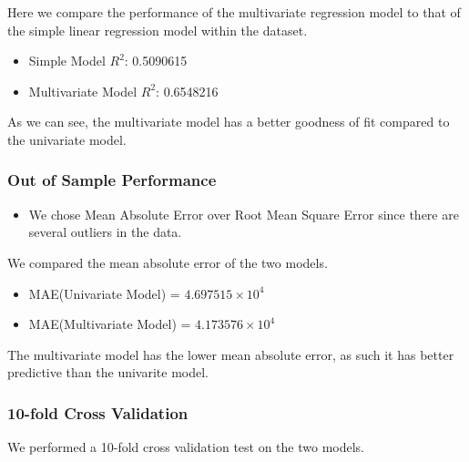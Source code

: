 \documentclass[letterpaper,9pt,twocolumn,twoside,]{pinp}
\providecommand{\tightlist}{%
  \setlength{\itemsep}{0pt}\setlength{\parskip}{0pt}}
\begin{document}
Here we compare the performance of the multivariate regression model to
that of the simple linear regression model within the dataset.

\begin{itemize}
\item
  Simple Model \(R^2\): 0.5090615
\item
  Multivariate Model \(R^2\): 0.6548216
\end{itemize}

As we can see, the multivariate model has a better goodness of fit
compared to the univariate model.

\hypertarget{out-of-sample-performance}{%
\subsubsection{Out of Sample
Performance}\label{out-of-sample-performance}}

\begin{itemize}
\tightlist
\item
  We chose Mean Absolute Error over Root Mean Square Error since there
  are several outliers in the data.
\end{itemize}

We compared the mean absolute error of the two models.

\begin{itemize}
\item
  MAE(Univariate Model) = \ensuremath{4.697515\times 10^{4}}
\item
  MAE(Multivariate Model) = \ensuremath{4.173576\times 10^{4}}
\end{itemize}

The multivariate model has the lower mean absolute error, as such it has
better predictive than the univarite model.

\hypertarget{fold-cross-validation}{%
\subsubsection{10-fold Cross Validation}\label{fold-cross-validation}}

We performed a 10-fold cross validation test on the two models.
\end{document}
